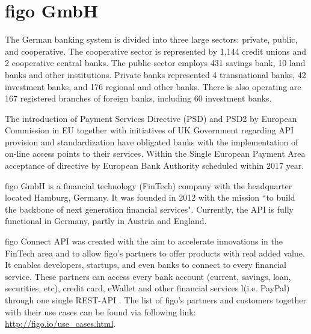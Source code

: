 \chapter{figo GmbH}
\label{chaper:figo}
The German banking system is divided into three large sectors: private, public, and cooperative. The cooperative sector is represented by 1,144 credit unions and 2 cooperative central banks. The public sector employs 431 savings bank, 10 land banks and other institutions. Private banks represented 4 transnational banks, 42 investment banks, and 176 regional and other banks. There is also operating are 167 registered branches of foreign banks, including 60 investment banks\cite{listOfBanks}.   

The introduction of Payment Services Directive (PSD) and PSD2 by European Commission in EU together with initiatives of UK Government regarding API provision and standardization have obligated banks with the implementation of on-line access points to their services\cite{LarsAPI}\cite{TimAPI}\cite{DaveAPI}. Within the Single European Payment Area acceptance of directive by European Bank Authority scheduled within 2017 year\cite{PSD2}.

figo GmbH is a financial technology (FinTech) company with the headquarter located Hamburg, Germany. It was founded in 2012  with the mission “to build the backbone of next generation financial services"\cite{figoFAQVision}.  Currently, the API is fully functional in Germany, partly in Austria and England\cite{figoAngel}\cite{figoCB}.

figo Connect API was created with the aim to accelerate innovations in the FinTech area and to allow figo's partners to offer products with real added value\cite{figoFAQWhat}. It enables developers, startups, and even banks to connect to every financial service. These partners can access every bank account (current, savings, loan, securities, etc), credit card, eWallet and other financial services l(i.e. PayPal) through one single REST-API \cite{figoFAQWhat}\cite{figoFAQVision}\cite{figoFAQPartners}. The list of figo's partners and customers  together with their use cases can be found via following link: \url{http://figo.io/use\_cases.html}.


